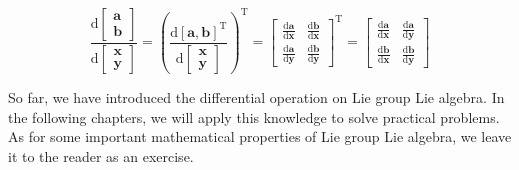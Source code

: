 \begin{equation}
\frac{\mathrm{\mathrm{d}}\begin{bmatrix}
	\bm{a}\\
	\bm{b}
	\end{bmatrix}}{{\mathrm{d} \begin{bmatrix}
		\bm{x}\\
		\bm{y}
		\end{bmatrix}}} = {\left( \frac{\mathrm{d}[\bm{a},\bm{b}]^\mathrm{T}}{{\mathrm{d}\begin{bmatrix}
			\bm{x}\\
			\bm{y}
			\end{bmatrix}}} \right)^\mathrm{T}} = {{\begin{bmatrix}
		{\frac{{\mathrm{d}\bm{a}}}{{\mathrm{d}\bm{x}}}}&{\frac{{\mathrm{d}\bm{b}}}{{\mathrm{d}\bm{x}}}}\\
		{\frac{{\mathrm{d}\bm{a}}}{{\mathrm{d}\bm{y}}}}&{\frac{{\mathrm{d}\bm{b}}}{{\mathrm{d}\bm{y}}}}
		\end{bmatrix}} ^\mathrm{T}} = {\begin{bmatrix}
	{\frac{{\mathrm{d}\bm{a}}}{{\mathrm{d}\bm{x}}}}&{\frac{{\mathrm{d}\bm{a}}}{{\mathrm{d}\bm{y}}}}\\
	{\frac{{\mathrm{d}\bm{b}}}{{\mathrm{d}\bm{x}}}}&{\frac{{\mathrm{d}\bm{b}}}{{\mathrm{d}\bm{y}}}}
	\end{bmatrix}}
\end{equation}

So far, we have introduced the differential operation on Lie group Lie algebra. In the following chapters, we will apply this knowledge to solve practical problems. As for some important mathematical properties of Lie group Lie algebra, we leave it to the reader as an exercise.
